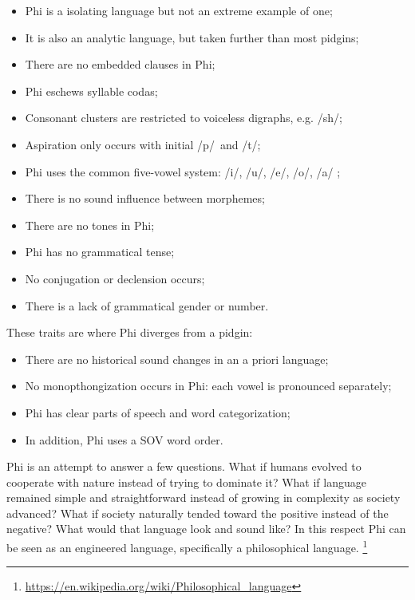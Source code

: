 \begin{itemize}[label=\raisebox{0.33ex}{\tiny$\bullet$},topsep=0pt]\itemsep-5pt
  \item Phi is a isolating language but not an extreme example of one;
  \item It is also an analytic language, but taken further than most pidgins;
  \item There are no embedded clauses in Phi;
  \item Phi eschews syllable codas;
  \item Consonant clusters are restricted to voiceless digraphs,
  e.g. \dscopy /sh/\normalfont;
  \item Aspiration only occurs with initial \dscopy /p/~\normalfont and
  \dscopy /t/\normalfont;
  \item Phi uses the common five-vowel system: \dscopy /i/, /u/, /e/, /o/, /a/%
  \normalfont;
  \item There is no sound influence between morphemes;
  \item There are no tones in Phi;
  \item Phi has no grammatical tense;
  \item No conjugation or declension occurs;
  \item There is a lack of grammatical gender or number.
\end{itemize}

These traits are where Phi diverges from a pidgin:

\begin{itemize}[label=\raisebox{0.33ex}{\tiny$\bullet$},topsep=0pt]\itemsep-5pt
  \item There are no historical sound changes in an a priori language;
  \item No monopthongization occurs in Phi: each vowel is pronounced separately;
  \item Phi has clear parts of speech and word categorization;
  \item In addition, Phi uses a SOV word order.
\end{itemize}

Phi is an attempt to answer a few questions. What if humans evolved to cooperate
with nature instead of trying to dominate it? What if language remained simple
and straightforward instead of growing in complexity as society advanced? What
if society naturally tended toward the positive instead of the negative? What
would that language look and sound like? In this respect Phi can be seen as an
engineered language, specifically a philosophical language.%
\footnote{\url{https://en.wikipedia.org/wiki/Philosophical_language}}